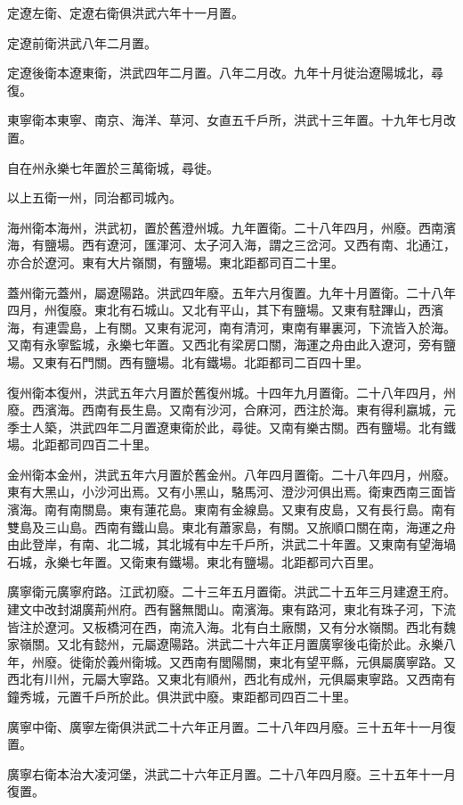定遼左衛、定遼右衛俱洪武六年十一月置。

定遼前衛洪武八年二月置。

定遼後衛本遼東衛，洪武四年二月置。八年二月改。九年十月徙治遼陽城北，尋復。

東寧衛本東寧、南京、海洋、草河、女直五千戶所，洪武十三年置。十九年七月改置。

自在州永樂七年置於三萬衛城，尋徙。

以上五衛一州，同治都司城內。

海州衛本海州，洪武初，置於舊澄州城。九年置衛。二十八年四月，州廢。西南濱海，有鹽場。西有遼河，匯渾河、太子河入海，謂之三岔河。又西有南、北通江，亦合於遼河。東有大片嶺關，有鹽場。東北距都司百二十里。

蓋州衛元蓋州，屬遼陽路。洪武四年廢。五年六月復置。九年十月置衛。二十八年四月，州復廢。東北有石城山。又北有平山，其下有鹽場。又東有駐蹕山，西濱海，有連雲島，上有關。又東有泥河，南有清河，東南有畢裏河，下流皆入於海。又南有永寧監城，永樂七年置。又西北有梁房口關，海運之舟由此入遼河，旁有鹽場。又東有石門關。西有鹽場。北有鐵場。北距都司二百四十里。

復州衛本復州，洪武五年六月置於舊復州城。十四年九月置衛。二十八年四月，州廢。西濱海。西南有長生島。又南有沙河，合麻河，西注於海。東有得利嬴城，元季士人築，洪武四年二月置遼東衛於此，尋徙。又南有樂古關。西有鹽場。北有鐵場。北距都司四百二十里。

金州衛本金州，洪武五年六月置於舊金州。八年四月置衛。二十八年四月，州廢。東有大黑山，小沙河出焉。又有小黑山，駱馬河、澄沙河俱出焉。衛東西南三面皆濱海。南有南關島。東有蓮花島。東南有金線島。又東有皮島，又有長行島。南有雙島及三山島。西南有鐵山島。東北有蕭家島，有關。又旅順口關在南，海運之舟由此登岸，有南、北二城，其北城有中左千戶所，洪武二十年置。又東南有望海堝石城，永樂七年置。又衛東有鐵場。東北有鹽場。北距都司六百里。

廣寧衛元廣寧府路。江武初廢。二十三年五月置衛。洪武二十五年三月建遼王府。建文中改封湖廣荊州府。西有醫無閭山。南濱海。東有路河，東北有珠子河，下流皆注於遼河。又板橋河在西，南流入海。北有白土廠關，又有分水嶺關。西北有魏家嶺關。又北有懿州，元屬遼陽路。洪武二十六年正月置廣寧後屯衛於此。永樂八年，州廢。徙衛於義州衛城。又西南有閭陽關，東北有望平縣，元俱屬廣寧路。又西北有川州，元屬大寧路。又東北有順州，西北有成州，元俱屬東寧路。又西南有鐘秀城，元置千戶所於此。俱洪武中廢。東距都司四百二十里。

廣寧中衛、廣寧左衛俱洪武二十六年正月置。二十八年四月廢。三十五年十一月復置。

廣寧右衛本治大凌河堡，洪武二十六年正月置。二十八年四月廢。三十五年十一月復置。


